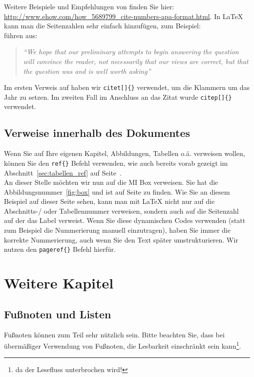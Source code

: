 Weitere Beispiele und Empfehlungen von \cite{Hall} finden Sie hier:  \url{http://www.ehow.com/how_5689799_cite-numbers-apa-format.html}. In \LaTeX{} kann man die Seitenzahlen sehr einfach hinzufügen, zum Beispiel: \\

\citet[S. 86]{Baddeley:1974ts} führen aus: 

\begin{quotation}
	\emph{``We hope that our preliminary attempts to begin answering the question will convince the reader, not necessarily that our views are correct, but that the question was and is well worth asking''}
	\citep[p. 86]{Baddeley:1974ts}
\end{quotation}

Im ersten Verweis auf \citeauthor{Baddeley:1974ts} haben wir \texttt{citet[]\{\}} verwendet, um die Klammern um das Jahr zu setzen. Im zweiten Fall im Anschluss an das Zitat wurde \texttt{citep[]\{\}} verwendet.

\section{Verweise innerhalb des Dokumentes} %
\label{sec:verweise_im_dokument}

Wenn Sie auf Ihre eigenen Kapitel, Abbildungen, Tabellen o.ä. verweisen wollen, können Sie den \texttt{ref\{\}} Befehl verwenden, wie auch bereits vorab gezeigt im Abschnitt~\ref{sec:tabellen_ref} auf Seite~\pageref{sec:tabellen_ref}.  \\

An dieser Stelle möchten wir nun auf die MI Box verweisen. Sie hat die Abbildungsnummer~\ref{fig:box} und ist auf Seite \pageref{fig:box} zu finden. Wie Sie an diesem Beispiel auf dieser Seite sehen, kann man mit \LaTeX{} nicht nur auf die Abschnitts-/ oder Tabellennummer verweisen, sondern auch auf die Seitenzahl auf der das Label verweist. Wenn Sie diese dynamischen Codes verwenden (statt zum Beispiel die Nummerierung manuell einzutragen), haben Sie immer die korrekte Nummerierung, auch wenn Sie den Text später umstrukturieren. Wir nutzen den \texttt{pageref\{\}} Befehl hierfür.



\chapter{Weitere Kapitel}
\label{cha:weitere_kapitel}

\section{Fußnoten und Listen} %
\label{sec:fussnoten_listen}
Fußnoten können zum Teil sehr nützlich sein. Bitte beachten Sie, dass bei übermäßiger Verwendung von Fußnoten, die Lesbarkeit einschränkt sein kann\footnote{ da der Lesefluss unterbrochen wird!}. 

